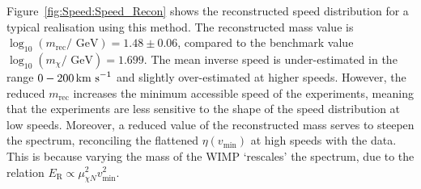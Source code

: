 Figure~\ref{fig:Speed:Speed_Recon} shows the reconstructed speed distribution for a typical realisation using this method. The reconstructed mass value is \(\log_{10} (m_\textrm{rec} / \textrm{ GeV}) = 1.48 \pm 0.06\), compared to the benchmark value \(\log_{10} (m_\chi / \textrm{ GeV}) = 1.699\). The mean inverse speed is under-estimated in the range \(0 - 200 \,\textrm{km s}^{-1}\) and slightly over-estimated at higher speeds. However, the reduced \(m_\textrm{rec}\) increases the minimum accessible speed of the experiments, meaning that the experiments are less sensitive to the shape of the speed distribution at low speeds. Moreover, a reduced value of the reconstructed mass serves to steepen the spectrum, reconciling the flattened \(\eta(v_\textrm{min})\) at high speeds with the data. This is because varying the mass of the WIMP `rescales' the spectrum, due to the relation \(E_\textrm{R} \propto \mu_{\chi N}^2 v_{\textrm{min}}^2\).



